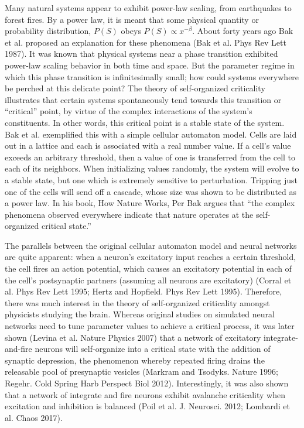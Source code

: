 Many natural systems appear to exhibit power-law scaling, from earthquakes to forest fires. By a power law, it is meant that some physical quantity or probability distribution, $P(S)$ obeys $P(S)\propto x^{-\beta}$. About forty years ago Bak et al. proposed an explanation for these phenomena (Bak et al. Phys Rev Lett 1987). It was known that physical systems near a phase transition exhibited power-law scaling behavior in both time and space. But the parameter regime in which this phase transition is infinitesimally small; how could systems everywhere be perched at this delicate point? The theory of self-organized criticality illustrates that certain systems spontaneously tend towards this transition or “critical” point, by virtue of the complex interactions of the system’s constituents. In other words, this critical point is a stable state of the system. Bak et al. exemplified this with a simple cellular automaton model. Cells are laid out in a lattice and each is associated with a real number value. If a cell’s value exceeds an arbitrary threshold, then a value of one is transferred from the cell to each of its neighbors. When initializing values randomly, the system will evolve to a stable state, but one which is extremely sensitive to perturbation. Tripping just one of the cells will send off a cascade, whose size was shown to be distributed as a power law. In his book, How Nature Works, Per Bak argues that “the complex phenomena observed everywhere indicate that nature operates at the self-organized critical state.”

The parallels between the original cellular automaton model and neural networks are quite apparent: when a neuron’s excitatory input reaches a certain threshold, the cell fires an action potential, which causes an excitatory potential in each of the cell’s postsynaptic partners (assuming all neurons are excitatory) (Corral et al. Phys Rev Lett 1995; Hertz and Hopfield. Phys Rev Lett 1995). Therefore, there was much interest in the theory of self-organized criticality amongst physicists studying the brain. Whereas original studies on simulated neural networks need to tune parameter values to achieve a critical process, it was later shown (Levina et al. Nature Physics 2007) that a network of excitatory integrate-and-fire neurons will self-organize into a critical state with the addition of synaptic depression, the phenomenon whereby repeated firing drains the releasable pool of presynaptic vesicles (Markram and Tsodyks. Nature 1996; Regehr. Cold Spring Harb Perspect Biol 2012). Interestingly, it was also shown that a network of integrate and fire neurons exhibit avalanche criticality when excitation and inhibition is balanced (Poil et al. J. Neurosci. 2012; Lombardi et al. Chaos 2017). 

